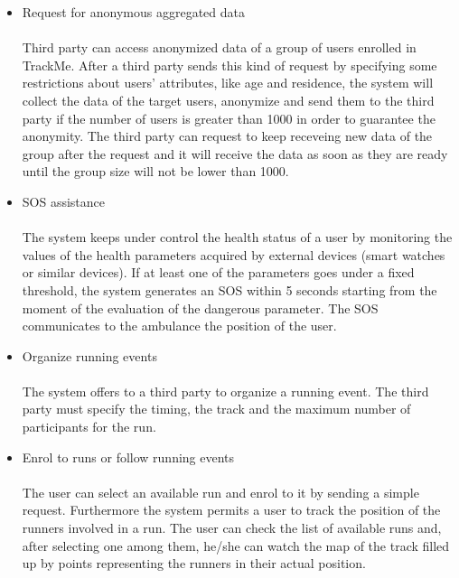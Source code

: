 \documentclass{article}
\begin{document}
\begin{legal}
\begin{legal}
{\begin{itemize}
		This function permits a third party (an association, an hospital, a company, etc) to ask for the data of a single user. More in detail, the third party can select a user by his/her SSN and send him/her a request to be allowed to access his/her data. If the user accepts it, then the third party will receive his/her data. The third party can request to keep monitoring the individual also after the request and it will receive the data as soon as they are ready. The user can decide to deny the permission at any moment. \\
		\item Request for anonymous aggregated data\\\\
		Third party can access anonymized data of a group of users enrolled in TrackMe. After a third party sends this kind of request by specifying some restrictions about users’ attributes, like age and residence, the system will collect the data of the target users, anonymize and send them to the third party if the number of users is greater than 1000 in order to guarantee the anonymity. The third party can request to keep receveing new data of the group after the request and it will receive the data as soon as they are ready until the group size will not be lower than 1000.\\
		\item SOS assistance\\\\
		The system keeps under control the health status of a user by monitoring the values of the health parameters acquired by external devices (smart watches or similar devices). If at least one of the parameters goes under a fixed threshold, the system generates an SOS within 5 seconds starting from the moment of the evaluation of the dangerous parameter. The SOS communicates to the ambulance the position of the user.\\
		\item Organize running events\\\\
		The system offers to a third party to organize a running event. The third party must specify the timing, the track and the maximum number of participants for the run.\\
		\item Enrol to runs or follow running events\\\\
		The user can select an available run and enrol to it by sending a simple request. Furthermore the system permits a user to track the position of the runners involved in a run. The user can check the list of available runs and, after selecting one among them, he/she can watch the map of the track filled up by points representing the runners in their actual position. \\

\end{itemize}}
\end{legal}
\end{legal}
\end{document}
